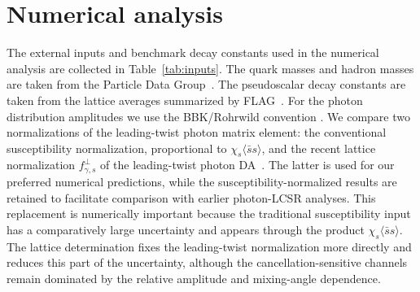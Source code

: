 \documentclass[aps,prd,preprint,nofootinbib,superscriptaddress]{revtex4-2}
\begin{document}
\section{Numerical analysis}
\label{sec:numerics}

The external inputs and benchmark decay constants used in the numerical
analysis are collected in Table~\ref{tab:inputs}.  The quark masses and hadron
masses are taken from the Particle Data Group~\cite{ParticleDataGroup:2024cfk}.
The pseudoscalar decay constants are taken from the lattice averages
summarized by FLAG~\cite{FlavourLatticeAveragingGroupFLAG:2024oxs}.  For the
photon distribution amplitudes we use the BBK/Rohrwild convention
\cite{Ball:2002ps,Rohrwild:2007yt}.  We compare two normalizations of the
leading-twist photon matrix element: the conventional susceptibility
normalization, proportional to $\chi_s\langle\bar s s\rangle$, and the recent
lattice normalization $f_{\gamma,s}^{\perp}$ of the leading-twist photon
DA~\cite{Bacchio:2024pij}.  The latter is used for our preferred numerical
predictions, while the susceptibility-normalized results are retained to
facilitate comparison with earlier photon-LCSR analyses.
This replacement is numerically important because the traditional
susceptibility input has a comparatively large uncertainty and appears through
the product $\chi_s\langle\bar s s\rangle$.  The lattice determination fixes
the leading-twist normalization more directly and reduces this part of the
uncertainty, although the cancellation-sensitive channels remain dominated by
the relative amplitude and mixing-angle dependence.
\end{document}

